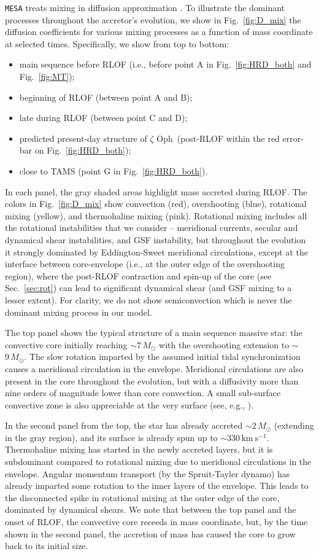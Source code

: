 \documentclass[twocolumn,twocolappendix,trackchanges]{aastex63}
\newcommand{\kms}{{\mathrm{km\ s^{-1}}}}
\DeclareRobustCommand{\Figref}[1]{Fig.~\ref{#1}}
\DeclareRobustCommand{\Secref}[1]{Sec.~\ref{#1}}
\newcommand{\zoph}{$\zeta$ Oph}
\begin{document}
\texttt{MESA} treats mixing in diffusion approximation
\citep{paxton:11}. To illustrate the dominant processes throughout the
accretor's evolution, we show in \Figref{fig:D_mix} the diffusion
coefficients for various mixing processes as a function of mass
coordinate at selected times. Specifically, we show from top to
bottom:
\begin{itemize}
\item main sequence before RLOF (i.e., before point A in
  \Figref{fig:HRD_both} and \Figref{fig:MT});
\item beginning of RLOF (between point A and B);
\item late during RLOF (between point C and D);
\item predicted present-day structure of \zoph\ (post-RLOF within the
  red error-bar on \Figref{fig:HRD_both});
\item close to TAMS (point G in \Figref{fig:HRD_both}).
\end{itemize}
In each panel, the gray shaded areas highlight mass accreted during RLOF.
The colors in \Figref{fig:D_mix} show convection (red), overshooting
(blue), rotational mixing (yellow), and thermohaline mixing
(pink). Rotational mixing includes all the rotational instabilities
that we consider -- meridional currents, secular and dynamical shear instabilities,
and GSF instability, but throughout the evolution
it strongly dominated by Eddington-Sweet meridional circulations,
except at the interface between core-envelope (i.e., at the outer edge
of the overshooting region), where the post-RLOF contraction and
spin-up of the core (see \Secref{sec:rot}) can lead to significant
dynamical shear (and GSF mixing to a lesser extent).
For clarity, we do not show semiconvection
which is never the dominant mixing process in our model.

The top panel shows the typical structure of a main sequence massive star:
the convective core initially reaching
$\sim$$7\,M_\odot$ with the overshooting extension to $\sim$$9\,M_\odot$. The
slow rotation imparted by the assumed initial tidal synchronization
causes a meridional circulation in the envelope. Meridional
circulations are also present in the core throughout the evolution,
but with a diffusivity more than nine orders of magnitude lower than
core convection. A small sub-surface
convective zone is also appreciable at the very surface (see, e.g., \citealt{cantiello:21}).

In the second panel from the top, the star has already accreted
$\sim$$2\,M_\odot$ (extending in the gray region), and its surface is already spun up to $\sim
330\,\kms$. Thermohaline mixing has started in the newly accreted layers, but it is subdominant compared to rotational mixing due to meridional circulations in the envelope.  Angular momentum transport (by the Spruit-Tayler dynamo) has already imparted some rotation to the inner layers of the envelope. This leads to the disconnected spike in rotational mixing at the outer edge of the core, dominated by dynamical shears.  We note that between the top panel and the onset of RLOF, the convective core receeds in mass coordinate, but, by the time shown in the second panel, the accretion of mass has caused the core to grow back to its initial size.
\end{document}
